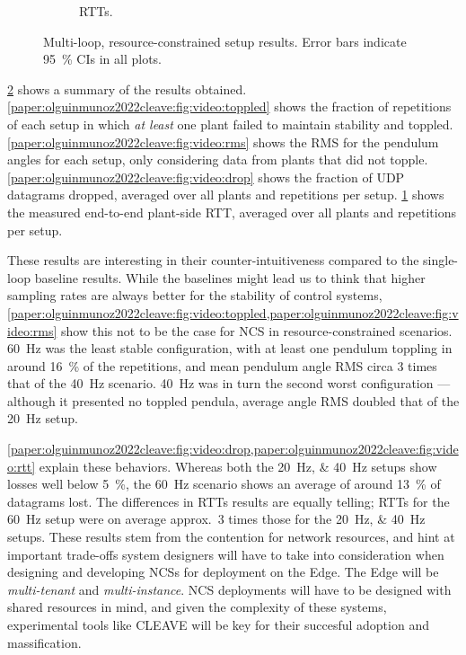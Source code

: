 \begin{figure}[t]
\begin{subfigure}[h]{.45\textwidth}
        \caption{\glspl{RTT}.}\label{paper:olguinmunoz2022cleave:fig:video:rtt}
    \end{subfigure}%
    \caption{
        Multi-loop, resource-constrained setup results.
        Error bars indicate \SI{95}{\percent} \glspl{CI} in all plots.
    }\label{paper:olguinmunoz2022cleave:fig:video:results}
\end{figure}

\cref{paper:olguinmunoz2022cleave:fig:video:results} shows a summary of the results obtained.
\cref{paper:olguinmunoz2022cleave:fig:video:toppled} shows the fraction of repetitions of each setup in which \emph{at least} one plant failed to maintain stability and toppled.
\cref{paper:olguinmunoz2022cleave:fig:video:rms} shows the \gls{RMS} for the pendulum angles for each setup, only considering data from plants that did not topple.
\cref{paper:olguinmunoz2022cleave:fig:video:drop} shows the fraction of \gls{UDP} datagrams dropped, averaged over all plants and repetitions per setup.
\cref{paper:olguinmunoz2022cleave:fig:video:rtt} shows the measured end-to-end plant-side \gls{RTT}, averaged over all plants and repetitions per setup.

These results are interesting in their counter-intuitiveness compared to the single-loop baseline results.
While the baselines might lead us to think that higher sampling rates are always better for the stability of control systems, \cref{paper:olguinmunoz2022cleave:fig:video:toppled,paper:olguinmunoz2022cleave:fig:video:rms} show this not to be the case for \gls{NCS} in resource-constrained scenarios.
\SI{60}{\hertz} was the least stable configuration, with at least one pendulum toppling in around \SI{16}{\percent} of the repetitions, and mean pendulum angle \gls{RMS} circa \num{3} times that of the \SI{40}{\hertz} scenario.
\SI{40}{\hertz} was in turn the second worst configuration --- although it presented no toppled pendula, average angle \gls{RMS} doubled that of the \SI{20}{\hertz} setup.

\cref{paper:olguinmunoz2022cleave:fig:video:drop,paper:olguinmunoz2022cleave:fig:video:rtt} explain these behaviors.
Whereas both the \SIlist{20;40}{\hertz} setups show losses well below \SI{5}{\percent}, the \SI{60}{\hertz} scenario shows an average of around \SI{13}{\percent} of datagrams lost.
The differences in \glspl{RTT} results are equally telling; \glspl{RTT} for the \SI{60}{\hertz} setup were on average approx.\ \num{3} times those for the \SIlist{20;40}{\hertz} setups.
These results stem from the contention for network resources, and hint at important trade-offs system designers will have to take into consideration when designing and developing \glspl{NCS} for deployment on the Edge.
The Edge will be \emph{multi-tenant} and \emph{multi-instance}. 
\gls{NCS} deployments will have to be designed with shared resources in mind, and given the complexity of these systems, experimental tools like \gls{CLEAVE} will be key for their succesful adoption and massification.
